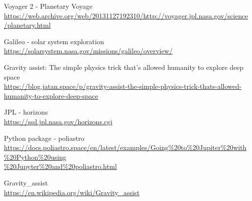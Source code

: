 \documentclass{article}
\begin{document}
\begin{thebibliography}{00}

Voyager 2 - Planetary Voyage\\
 \href{https://web.archive.org/web/20131127192310/http://voyager.jpl.nasa.gov/science/planetary.html}{https://web.archive.org/web/20131127192310/http://voyager.jpl.nasa.gov/science/planetary.html}
 
Galileo - solar system exploration\\
 \href{https://solarsystem.nasa.gov/missions/galileo/overview/}{https://solarsystem.nasa.gov/missions/galileo/overview/}

Gravity assist: The simple physics trick that’s allowed humanity to explore deep space\\
 \href{https://blog.jatan.space/p/gravity-assist-the-simple-physics-trick-thats-allowed-humanity-to-explore-deep-space}{https://blog.jatan.space/p/gravity-assist-the-simple-physics-trick-thats-allowed-humanity-to-explore-deep-space}

JPL - horizons\\
 \href{https://ssd.jpl.nasa.gov/horizons.cgi}{https://ssd.jpl.nasa.gov/horizons.cgi}

Python package - poliastro\\
\href{https://docs.poliastro.space/en/latest/examples/Going\%20to\%20Jupiter\%20with\%20Python\%20using\%20Jupyter\%20and\%20poliastro.html}{https://docs.poliastro.space/en/latest/examples/Going\%20to\%20Jupiter\%20with\%20Python\%20using\\
\%20Jupyter\%20and\%20poliastro.html}

Gravity\_assist\\
 \href{https://en.wikipedia.org/wiki/Gravity\_assist}{https://en.wikipedia.org/wiki/Gravity\_assist}



\end{thebibliography}
\end{document}

